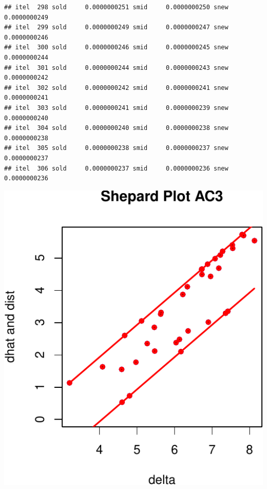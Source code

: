 \documentclass[
  12pt,
]{article}
\begin{document}
\begin{verbatim}
## itel  298 sold     0.0000000251 smid     0.0000000250 snew     0.0000000249 
## itel  299 sold     0.0000000249 smid     0.0000000247 snew     0.0000000246 
## itel  300 sold     0.0000000246 smid     0.0000000245 snew     0.0000000244 
## itel  301 sold     0.0000000244 smid     0.0000000243 snew     0.0000000242 
## itel  302 sold     0.0000000242 smid     0.0000000241 snew     0.0000000241 
## itel  303 sold     0.0000000241 smid     0.0000000239 snew     0.0000000240 
## itel  304 sold     0.0000000240 smid     0.0000000238 snew     0.0000000238 
## itel  305 sold     0.0000000238 smid     0.0000000237 snew     0.0000000237 
## itel  306 sold     0.0000000237 smid     0.0000000236 snew     0.0000000236
\end{verbatim}

\begin{center}\includegraphics{smacofAC_files/figure-latex/gruijterh01-1} \end{center}
\end{document}
